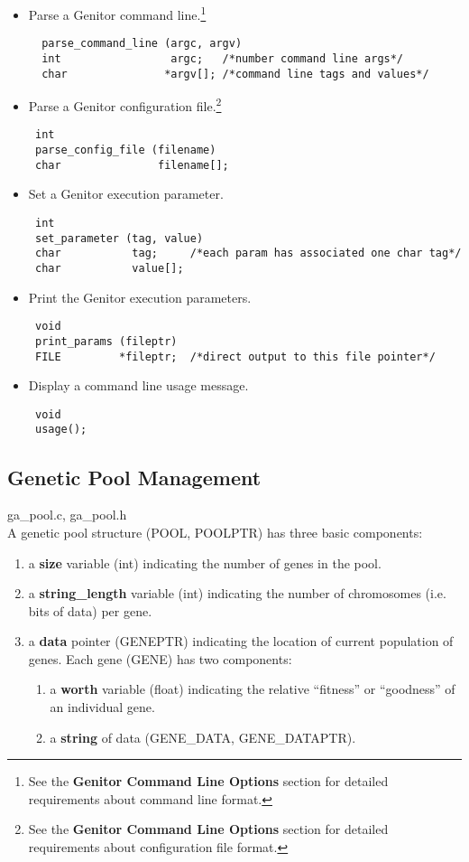 \begin{itemize}
\item Parse a Genitor command line.\footnote{See the {\bf Genitor Command Line
Options} section for detailed requirements about command line format.}
\begin{verbatim}
  parse_command_line (argc, argv)
  int                 argc;   /*number command line args*/
  char               *argv[]; /*command line tags and values*/

\end{verbatim}
\item Parse a Genitor configuration file.\footnote{See the {\bf Genitor Command
Line Options} section for detailed requirements about configuration file format.}
\begin{verbatim}
 int
 parse_config_file (filename)
 char               filename[];
\end{verbatim}
\item Set a Genitor execution parameter.
\begin{verbatim}
 int
 set_parameter (tag, value)
 char           tag;     /*each param has associated one char tag*/
 char           value[];
\end{verbatim}
\item Print the Genitor execution parameters.
\begin{verbatim}
 void
 print_params (fileptr)
 FILE         *fileptr;  /*direct output to this file pointer*/
\end{verbatim}
\item Display a command line usage message.
\begin{verbatim}
 void
 usage();
\end{verbatim}
\end{itemize}
\subsection{Genetic Pool Management}

ga\_pool.c, ga\_pool.h
\\
A genetic pool structure (POOL, POOLPTR) has three basic components: 

\begin{enumerate}
 \item a {\bf size} variable (int) indicating the number of genes in the pool.
 \item a {\bf string\_length} variable (int) indicating the number of
	   chromosomes (i.e. bits of data) per gene.
 \item a {\bf data} pointer (GENEPTR) indicating the location of current
	   population of genes.  Each gene (GENE) has two components:
	   \begin{enumerate}
		\item a {\bf worth} variable (float) indicating the relative ``fitness''
			  or ``goodness'' of an individual gene. 
		\item a {\bf string} of data (GENE\_DATA, GENE\_DATAPTR).
       \end{enumerate}
\end{enumerate}

